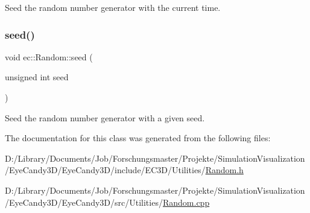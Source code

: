 Seed the random number generator with the current time. \mbox{\label{classec_1_1_random_aa2b21cb97b3a7c36e89b8afda6ca500d}} 
\subsubsection{\texorpdfstring{seed()}{seed()}\hspace{0.1cm}{\footnotesize\ttfamily [2/2]}}
{\footnotesize\ttfamily void ec\+::\+Random\+::seed (\begin{DoxyParamCaption}\item[{unsigned int}]{seed }\end{DoxyParamCaption})\hspace{0.3cm}{\ttfamily [static]}}

Seed the random number generator with a given seed. 

The documentation for this class was generated from the following files\+:\begin{DoxyCompactItemize}
\item 
D\+:/\+Library/\+Documents/\+Job/\+Forschungsmaster/\+Projekte/\+Simulation\+Visualization/\+Eye\+Candy3\+D/\+Eye\+Candy3\+D/include/\+E\+C3\+D/\+Utilities/\mbox{\hyperlink{_random_8h}{Random.\+h}}\item 
D\+:/\+Library/\+Documents/\+Job/\+Forschungsmaster/\+Projekte/\+Simulation\+Visualization/\+Eye\+Candy3\+D/\+Eye\+Candy3\+D/src/\+Utilities/\mbox{\hyperlink{_random_8cpp}{Random.\+cpp}}\end{DoxyCompactItemize}
